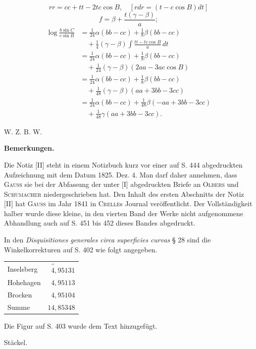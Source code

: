 %
\[
rr=cc+tt-2tc\cos B,\quad[rdr=(t-c\cos B)dt]
\]
\noindent [und]
\[
f=\beta+\frac{t(\gamma-\beta)}a;
\]
\[
\begin{aligned}
\log\frac{b\sin C}{c\sin B}&=\tfrac1{24}\alpha(bb-cc)+\tfrac18\beta(bb-cc)\\
&\quad+\tfrac14(\gamma-\beta)\int\frac{tt-tc\cos B}a\,dt\\
&=\tfrac1{24}\alpha(bb-cc)+\tfrac18\beta(bb-cc)\\
&\quad+\tfrac1{24}(\gamma-\beta)(2aa-3ac\cos B)\\
&=\tfrac1{24}\alpha(bb-cc)+\tfrac18\beta(bb-cc)\\
&\quad+\tfrac1{48}(\gamma-\beta)(aa+3bb-3cc)\\
&=\tfrac1{24}\alpha(bb-cc)+\tfrac1{48}\beta(-aa+3bb-3cc)\\
&\quad+\tfrac1{48}\gamma(aa+3bb-3cc).
\end{aligned}
\]
\begin{flushright}W. Z. B. W.\end{flushright}
\par{}\begin{center}\textbf{Bemerkungen.}\end{center}
\noindent\hspace*{1.2em}Die Notiz [II] steht in einem Notizbuch kurz vor einer auf S. 444 abgedruckten Aufzeichnung mit dem Datum 1825. Dez. 4. Man darf daher annehmen, dass \textsc{Gauss} sie bei der Abfassung der unter [I] abgedruckten Briefe an \textsc{Olbers} und \textsc{Schumacher} niedergeschrieben hat. Den Inhalt des ersten Abschnitts der Notiz [II] hat \textsc{Gauss} im Jahr 1841 in \textsc{Crelle}s Journal veröffentlicht. Der Vollständigkeit halber wurde diese kleine, in den vierten Band der Werke nicht aufgenommene Abhandlung auch auf S. 451 bis 452 dieses Bandes abgedruckt.

In den \textit{Disquisitiones generales circa superficies curvas} § 28 sind die Winkelkorrekturen auf S. 402 wie folgt angegeben.
\begin{center}\begin{tabular}{lr}
Inselsberg & $\overset{\prime\prime}{4}{,}95131$\\
Hohehagen & $4{,}95113$\\
Brocken & $4{,}95104$\\
Summe & $14{,}85348$
\end{tabular}\end{center}
\noindent\hspace*{1.2em}Die Figur auf S. 403 wurde dem Text hinzugefügt.
\begin{flushright}Stäckel.\end{flushright}
